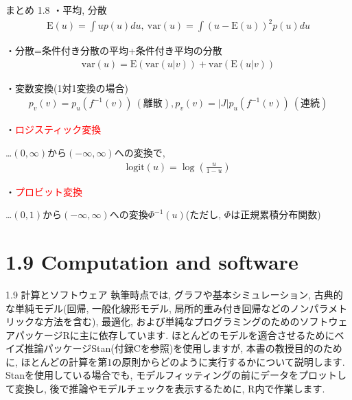 \documentclass[10pt,dvipdfmx,a4]{beamer}
\newcommand{\eqn}[1]{\begin{align*}#1\end{align*}}
\newcommand{\tcr}[1]{\textcolor{red}{#1}}
\begin{document}

\begin{frame}{まとめ 1.8}
・平均, 分散
\eqn{\text{E}(u)=\int u p(u)du,\ \text{var}(u)=\int (u-\text{E}(u))^2 p(u)du}

・分散=条件付き分散の平均+条件付き平均の分散
\eqn{\text{var}(u)=\text{E}(\text{var}(u|v))+\text{var}(\text{E}(u|v))}

・変数変換(1対1変換の場合)
\eqn{p_v(v)=p_u(f^{-1}(v))\ (\text{離散}), p_v(v)=|J|p_u(f^{-1}(v))\ (\text{連続})}

・\tcr{ロジスティック変換}

…$(0,\infty)$から$(-\infty,\infty)$への変換で,
\eqn{\text{logit}(u)=\log \left(\frac{u}{1-u}\right)}

・\tcr{プロビット変換}

…$(0,1)$から$(-\infty,\infty)$への変換$\Phi^{-1}(u)$(ただし, $\Phi$は正規累積分布関数)
\end{frame}

\section{1.9 Computation and software}
\begin{frame}{1.9 計算とソフトウェア}
執筆時点では, グラフや基本シミュレーション, 古典的な単純モデル(回帰, 一般化線形モデル, 局所的重み付き回帰などのノンパラメトリックな方法を含む), 最適化, および単純なプログラミングのためのソフトウェアパッケージRに主に依存しています.
ほとんどのモデルを適合させるためにベイズ推論パッケージStan(付録Cを参照)を使用しますが, 本書の教授目的のために, ほとんどの計算を第1の原則からどのように実行するかについて説明します.
Stanを使用している場合でも, モデルフィッティングの前にデータをプロットして変換し, 後で推論やモデルチェックを表示するために, R内で作業します.
\end{frame}

\end{document}
